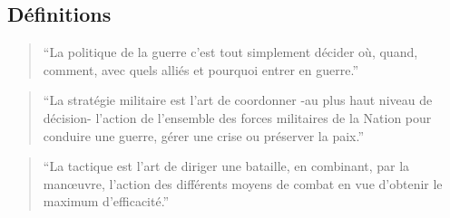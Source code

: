 \documentclass{article}
\begin{document}
\subsection{Définitions}

\begin{quote}“La politique de la guerre c’est tout simplement décider où, quand, comment, avec quels alliés et pourquoi entrer en guerre.”\end{quote}
\begin{quote}“La stratégie militaire est l'art de coordonner -au plus haut niveau de décision- l'action de l'ensemble des forces militaires de la Nation pour conduire une guerre, gérer une crise ou préserver la paix.”\end{quote}
\begin{quote}“La tactique est l'art de diriger une bataille, en combinant, par la manœuvre, l'action des différents moyens de combat en vue d'obtenir le maximum d'efficacité.”\end{quote}
\cite{military_strategy, tactic, politique_jomini}
\end{document}
